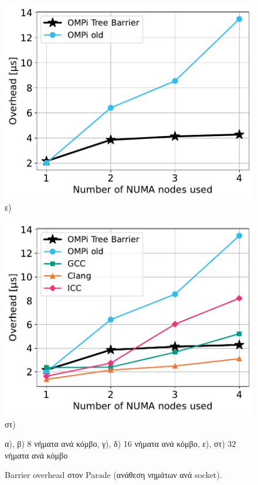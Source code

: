 \begin{figure}[htbp]
\begin{minipage}{0.5\textwidth}
        \includegraphics[width=1\textwidth]{Figures/parade-epcc/ompionly_sockets_tpn-32_close.pdf}
        ε)
    \end{minipage}\hfill
    \begin{minipage}{0.5\textwidth}
        \centering
        \includegraphics[width=1\textwidth]{Figures/parade-epcc/sockets_tpn-32_close.pdf}
        στ)
    \end{minipage}
    \newline \newline
    {\small α), β) 8 νήματα ανά κόμβο, γ), δ) 16 νήματα ανά κόμβο, ε), στ) 32 νήματα ανά κόμβο}
    \caption{Barrier overhead στον Parade (ανάθεση νημάτων ανά socket).}
    \label{fig:bo-parade-sockets}
\end{figure}

